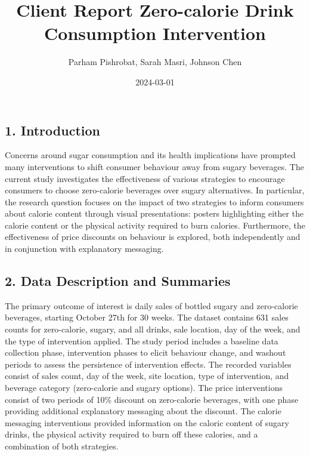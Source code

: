 \documentclass[
]{article}
\title{Client Report Zero-calorie Drink Consumption Intervention}
\author{Parham Pishrobat, Sarah Masri, Johnson Chen}
\date{2024-03-01}
\begin{document}
\maketitle

\hypertarget{introduction}{%
\subsection{1. Introduction}\label{introduction}}

Concerns around sugar consumption and its health implications have
prompted many interventions to shift consumer behaviour away from sugary
beverages. The current study investigates the effectiveness of various
strategies to encourage consumers to choose zero-calorie beverages over
sugary alternatives. In particular, the research question focuses on the
impact of two strategies to inform consumers about calorie content
through visual presentations: posters highlighting either the calorie
content or the physical activity required to burn calories. Furthermore,
the effectiveness of price discounts on behaviour is explored, both
independently and in conjunction with explanatory messaging.

\hypertarget{data-description-and-summaries}{%
\subsection{2. Data Description and
Summaries}\label{data-description-and-summaries}}

The primary outcome of interest is daily sales of bottled sugary and
zero-calorie beverages, starting October 27th for 30 weeks. The dataset
contains 631 sales counts for zero-calorie, sugary, and all drinks, sale
location, day of the week, and the type of intervention applied. The
study period includes a baseline data collection phase, intervention
phases to elicit behaviour change, and washout periods to assess the
persistence of intervention effects. The recorded variables consist of
sales count, day of the week, site location, type of intervention, and
beverage category (zero-calorie and sugary options). The price
interventions consist of two periods of 10\% discount on zero-calorie
beverages, with one phase providing additional explanatory messaging
about the discount. The calorie messaging interventions provided
information on the caloric content of sugary drinks, the physical
activity required to burn off these calories, and a combination of both
strategies.
\end{document}
